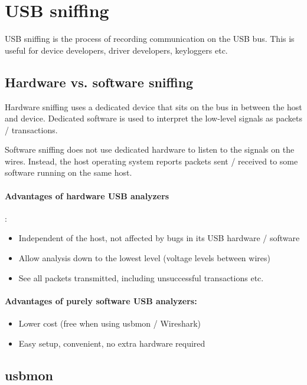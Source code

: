 \documentclass{article}
\begin{document}
\section{USB sniffing}

USB sniffing is the process of recording communication on the USB bus.
This is useful for device developers, driver developers, keyloggers etc.

\subsection{Hardware vs. software sniffing}

Hardware sniffing uses a dedicated device that sits on the bus in between the
host and device. Dedicated software is used to interpret the low-level signals
as packets / transactions.

Software sniffing does not use dedicated hardware to listen to the signals
on the wires. Instead, the host operating system reports packets sent / received
to some software running on the same host.

\paragraph*{Advantages of hardware USB analyzers \cite{analyzerbenefits}}:

\begin{itemize}
\item Independent of the host, not affected by bugs in its USB hardware / software
\item Allow analysis down to the lowest level (voltage levels between wires)
\item See all packets transmitted, including unsuccessful transactions etc.
\end{itemize}

\paragraph*{Advantages of purely software USB analyzers:}

\begin{itemize}
\item Lower cost (free when using usbmon / Wireshark)
\item Easy setup, convenient, no extra hardware required
\end{itemize}

\subsection{usbmon}
\end{document}
